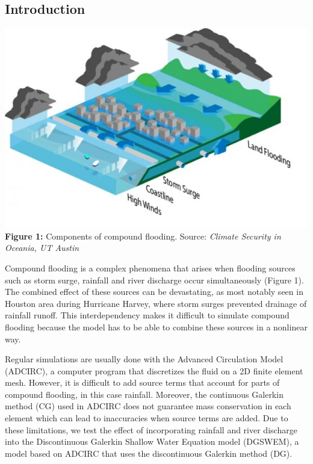 \documentclass[american]{article}
\begin{document}
\hrulefill
\vspace{10mm}
\fontsize{30}{36}\selectfont
\setlength{\columnsep}{1cm}
\vspace{-1.00cm}
\begin{multicols}{3}
\noindent

\section*{Introduction}

\begin{center}
  \vspace{5mm}
  \includegraphics[width=0.75\linewidth]{media/compound.jpg} \\
  \textbf{Figure 1:} Components of compound flooding. Source: \textit{Climate Security in Oceania, UT Austin}
\end{center}
Compound flooding is a complex phenomena that arises when flooding sources such as storm surge, rainfall and river discharge occur simultaneously (Figure 1). The combined effect of these sources can be devastating, as most notably seen in Houston area during Hurricane Harvey, where storm surges prevented drainage of rainfall runoff. This interdependency makes it difficult to simulate compound flooding because the model has to be able to combine these sources in a nonlinear way.

Regular simulations are usually done with the Advanced Circulation Model (ADCIRC), a computer program that discretizes the fluid on a 2D finite element mesh. However, it is difficult to add source terms that account for parts of compound flooding, in this case rainfall. Moreover, the continuous Galerkin method (CG) used in ADCIRC does not guarantee mass conservation in each element which can lead to inaccuracies when source terms are added.
Due to these limitations, we test the effect of incorporating rainfall and river discharge into the Discontinuous Galerkin Shallow Water Equation model (DGSWEM), a model based on ADCIRC that uses the discontinuous Galerkin method (DG).


\end{multicols}
\end{document}
